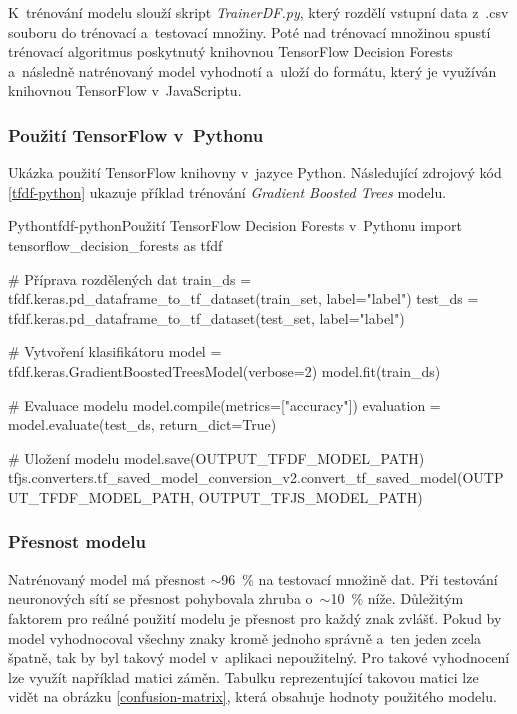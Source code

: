 \documentclass[
  master,
  program=ainfvs,
  biblatex,
  figures=true,
  tables=false,
  sourcecodes=true,
  glossaries,
  index
]{kidiplom}
\begin{document}
        K~trénování modelu slouží skript \emph{TrainerDF.py}, který rozdělí vstupní data z~.csv souboru do trénovací a~testovací množiny. Poté nad trénovací množinou spustí trénovací algoritmus poskytnutý knihovnou TensorFlow Decision Forests a~následně natrénovaný model vyhodnotí a~uloží do formátu, který je využíván knihovnou TensorFlow v~JavaScriptu.


        \subsubsection{Použití TensorFlow v~Pythonu}
            Ukázka použití TensorFlow knihovny v~jazyce Python. Následující zdrojový kód \ref{tfdf-python} ukazuje příklad trénování \emph{Gradient Boosted Trees} modelu. 
                 
                 \begin{kicode}{Python}{tfdf-python}{Použití TensorFlow Decision Forests v~Pythonu}
import tensorflow_decision_forests as tfdf

# Příprava rozdělených dat
train_ds = tfdf.keras.pd_dataframe_to_tf_dataset(train_set, label="label")
test_ds = tfdf.keras.pd_dataframe_to_tf_dataset(test_set, label="label")

# Vytvoření klasifikátoru
model = tfdf.keras.GradientBoostedTreesModel(verbose=2)
model.fit(train_ds)

# Evaluace modelu
model.compile(metrics=["accuracy"])
evaluation = model.evaluate(test_ds, return_dict=True)

# Uložení modelu
model.save(OUTPUT_TFDF_MODEL_PATH)
tfjs.converters.tf_saved_model_conversion_v2.convert_tf_saved_model(OUTPUT_TFDF_MODEL_PATH, OUTPUT_TFJS_MODEL_PATH)
                \end{kicode}


        \subsubsection{Přesnost modelu}
            Natrénovaný model má přesnost \(\sim \)96~\% na testovací množině dat. Při testování neuronových sítí se přesnost pohybovala zhruba o~\(\sim \)10~\% níže. Důležitým faktorem pro reálné použití modelu je přesnost pro každý znak zvlášť. Pokud by model vyhodnocoval všechny znaky kromě jednoho správně a~ten jeden zcela špatně, tak by byl takový model v~aplikaci nepoužitelný. Pro takové vyhodnocení lze využít například matici záměn. Tabulku reprezentující takovou matici lze vidět na obrázku \ref{confusion-matrix}, která obsahuje hodnoty použitého modelu.
\end{document}
